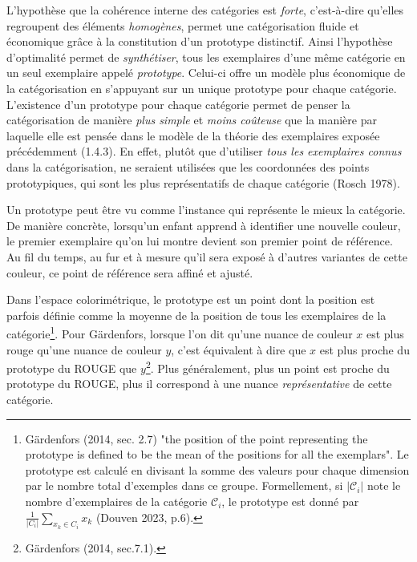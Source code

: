 \documentclass{article}
\begin{document}
L’hypothèse que la cohérence interne des catégories est \textit{forte}, c’est-à-dire qu’elles regroupent des éléments \textit{homogènes}, permet une catégorisation fluide et économique grâce à la constitution d’un prototype distinctif. Ainsi l’hypothèse d'optimalité permet de \textit{synthétiser}, tous les exemplaires d'une même catégorie en un seul exemplaire appelé \textit{prototype}. Celui-ci offre un modèle plus économique de la catégorisation en s’appuyant sur un unique prototype pour chaque catégorie. L’existence d’un prototype pour chaque catégorie permet de penser la catégorisation de manière \textit{plus simple} et \textit{moins coûteuse} que la manière par laquelle elle est pensée dans le modèle de la théorie des exemplaires exposée précédemment (1.4.3). En effet, plutôt que d’utiliser \textit{tous les exemplaires connus} dans la catégorisation, ne seraient utilisées que les coordonnées des points prototypiques, qui sont les plus représentatifs de chaque catégorie (Rosch 1978).
\par
Un prototype peut être vu comme l’instance qui représente le mieux la catégorie. De manière concrète, lorsqu’un enfant apprend à identifier une nouvelle couleur, le premier exemplaire qu’on lui montre devient son premier point de référence. Au fil du temps, au fur et à mesure qu'il sera exposé à d’autres variantes de cette couleur, ce point de référence sera affiné et ajusté.
\par
Dans l’espace colorimétrique, le prototype est un point dont la position est parfois définie comme la moyenne de la position de tous les exemplaires de la catégorie\footnote{Gärdenfors (2014, sec. 2.7) "the position of the point representing the prototype is defined to be the mean of the positions for all the exemplars". Le prototype est calculé en divisant la somme des valeurs pour chaque dimension par le nombre total d'exemples dans ce groupe. Formellement, si $|\mathcal{C}_i|$ note le nombre d'exemplaires de la catégorie $\mathcal{C}_i$, le prototype est donné par $\frac{1}{|C_i|} \sum_{x_k \in C_i} x_k$ (Douven 2023, p.6).}. Pour Gärdenfors, lorsque l’on dit qu’une nuance de couleur $x$ est \og plus rouge \fg qu’une nuance de couleur $y$, c’est équivalent à dire que $x$ est plus proche du prototype du ROUGE que $y$\footnote{Gärdenfors (2014, sec.7.1).}. Plus généralement, plus un point est proche du prototype du ROUGE, plus il correspond à une nuance \textit{représentative} de cette catégorie.
\par
\end{document}
